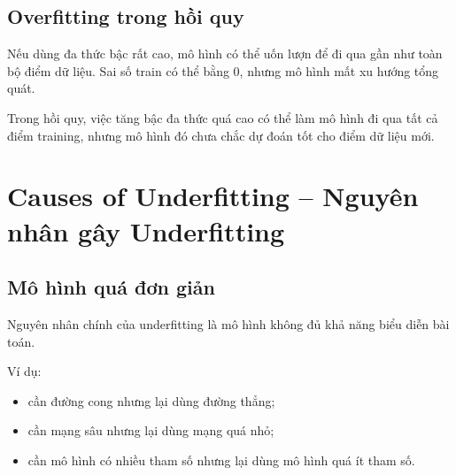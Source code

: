 \subsection{Overfitting trong hồi quy}

Nếu dùng đa thức bậc rất cao, mô hình có thể uốn lượn để đi qua gần như toàn bộ điểm dữ liệu. Sai số train có thể bằng 0, nhưng mô hình mất xu hướng tổng quát.

\begin{center}
\end{center}

\begin{canhbao}
Trong hồi quy, việc tăng bậc đa thức quá cao có thể làm mô hình đi qua tất cả điểm training, nhưng mô hình đó chưa chắc dự đoán tốt cho điểm dữ liệu mới.
\end{canhbao}

\section{Causes of Underfitting -- Nguyên nhân gây Underfitting}

\subsection{Mô hình quá đơn giản}

Nguyên nhân chính của underfitting là mô hình không đủ khả năng biểu diễn bài toán.

Ví dụ:

\begin{itemize}
    \item cần đường cong nhưng lại dùng đường thẳng;
    \item cần mạng sâu nhưng lại dùng mạng quá nhỏ;
    \item cần mô hình có nhiều tham số nhưng lại dùng mô hình quá ít tham số.
\end{itemize}

